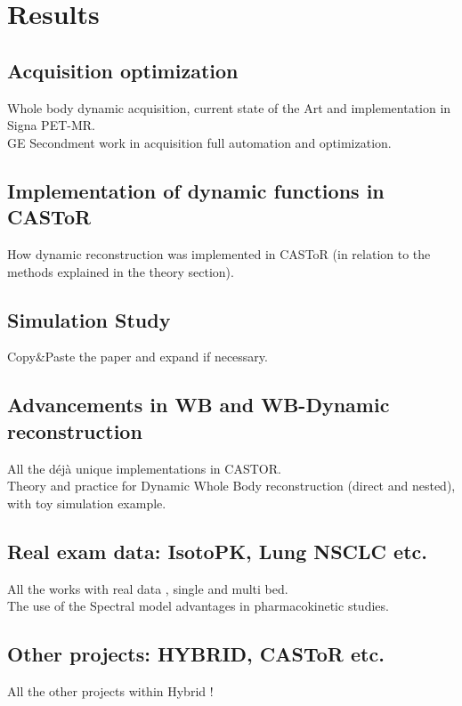 \chapter{Results}


\section{Acquisition optimization}
Whole body dynamic acquisition, current state of the Art and implementation in Signa PET-MR. \\
GE Secondment work in acquisition full automation and optimization. \\

\section{Implementation of dynamic functions in CASToR }
How dynamic reconstruction was implemented in CASToR (in relation to the methods explained in the theory section). \\


\section{Simulation Study}
Copy&Paste the paper and expand if necessary. \\

\section{Advancements in WB and WB-Dynamic reconstruction}
All the déjà unique implementations in CASTOR. \\
Theory and practice for Dynamic Whole Body reconstruction (direct and nested), with toy simulation example. \\

\section{Real exam data: IsotoPK, Lung NSCLC etc.}
All the works with real data , single and multi bed.  \\ 
The use of the Spectral model advantages in pharmacokinetic studies. \\

\section{Other projects: HYBRID, CASToR etc.}
All the other projects within Hybrid ! \\
